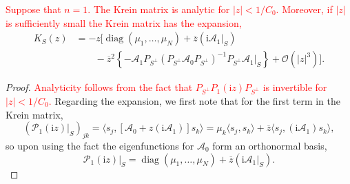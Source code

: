 \documentclass[review,onefignum,onetabnum]{siamart171218}
\def\diag{\mathop\mathrm{diag}\nolimits}
\newcommand{\rmi}{\mathrm{i}}
\newcommand{\calA}{\mathcal{A}}
\newcommand{\calO}{\mathcal{O}}
\newcommand{\calP}{\mathcal{P}}
\newcommand{\vK}{\bm{\mathit{K}}}
\newcommand{\revised}[1]{ \textcolor{red}{#1} }
\begin{document}
\begin{lemma}\label{l:52}
\revised{
Suppose that $n=1$. The Krein matrix is analytic for $|z|<1/C_0$. Moreover, if $|z|$ is sufficiently small the Krein matrix has the expansion,
}
\begin{equation}\label{KSz}
\begin{aligned}
\vK_S(z)&=-z\Big[\diag(\mu_1,\dots,\mu_N)+\overline{z}\left(\rmi\calA_1|_S\right)\\
&\qquad-
\overline{z}^2\left\{-
\calA_1P_{S^\perp}\left(P_{S^\perp}\calA_0P_{S^\perp}\right)^{-1}P_{S^\perp}\calA_1|_S\right\}
+\calO(|z|^3)\Big].
\end{aligned}
\end{equation}
\end{lemma}

\begin{proof}
\revised{
Analyticity follows from the fact that $P_{S^\perp}P_1(\rmi z)P_{S^\perp}$ is invertible for $|z|<1/C_0$.
}
Regarding the expansion, we first note that for the first term in the Krein matrix,
\[
\left(\calP_1(\rmi z)|_S\right)_{jk}=\langle s_j,[\calA_0+z(\rmi\calA_1)]s_k\rangle=
\mu_k\langle s_j,s_k\rangle+\overline{z}\langle s_j,(\rmi\calA_1)s_k\rangle,
\]
so upon using the fact the eigenfunctions for $\calA_0$ form an orthonormal basis,
\[
\calP_1(\rmi z)|_S=\diag(\mu_1,\dots,\mu_N)+\overline{z}\left(\rmi\calA_1|_S\right).
\]


\end{proof}
\end{document}
